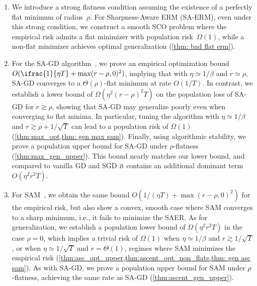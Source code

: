 \documentclass[11pt]{article}
\newcommand{\rad}{r}
\begin{document}
\begin{enumerate}[label=(\roman*),leftmargin=!,parsep=0pt,topsep=0pt]
\item We introduce a strong flatness condition assuming the existence of a perfectly flat minimum of radius~$\rho$. %
For Sharpness-Aware ERM (SA-ERM), even under this strong condition, we construct a smooth SCO problem where the empirical risk admits a flat minimizer with population risk~$\Omega(1)$, while a non-flat minimizer achieves optimal generalization (\cref{thm: bad flat erm}).

\item 
For the SA-GD algorithm~\citep{foret2021sharpness}, 
we prove an empirical optimization bound $O(\ifrac{1}{\eta T} + \max(\rad-\rho,0)^2)$, implying that with $\eta\simeq 1/\beta$ and $\rad\simeq\rho$, SA-GD converges to a $\Theta(\rho)$-flat minimum at rate $O(1/T)$. 
In contrast, we establish a lower bound of $\Omega(\eta^2(\rad-\rho)^2T)$ on the population loss of SA-GD for $\rad\gtrsim\rho$, showing that SA-GD may generalize poorly even when converging to flat minima. In particular, tuning the algorithm with $\eta\simeq 1/\beta$ and $\rad\gtrsim\rho+1/\sqrt{T}$ can lead to a population risk of $\Omega(1)$ (\cref{thm:max_opt,thm: gen max sam}). Finally, using algorithmic stability, we prove a population upper bound for SA-GD under $\rho$-flatness (\cref{thm:max_gen_upper}). 
This bound nearly matches our lower bound, and compared to vanilla GD and SGD it contains an additional dominant term  $O(\eta^2 \rad^2 T)$.


\item For SAM~\citep{foret2021sharpness}, we obtain the same bound $O(1/(\eta T) + \max(\rad-\rho,0)^2)$ for the empirical risk, but also show a convex, smooth case where SAM converges to a sharp minimum, i.e., it fails to minimize the SAER. As for generalization, we establish a population lower bound of $\Omega(\eta^2\rad^2T)$ in the case $\rho = 0$, which implies a trivial risk of $\Omega(1)$ when $\eta\simeq1/\beta$ and $\rad\gtrsim1/\sqrt{T}$, or when $\eta\simeq1/\sqrt{T}$ and $\rad=\Theta(1)$, regimes where SAM minimizes the empirical risk (\cref{thm:asc_opt_upper,thm:ascent_opt_non_flate,thm: gen asc sam}). As with SA-GD, we prove a population upper bound for SAM under $\rho$-flatness, achieving the same rate as SA-GD (\cref{thm:ascent_gen_upper}).



\end{enumerate}
\end{document}
